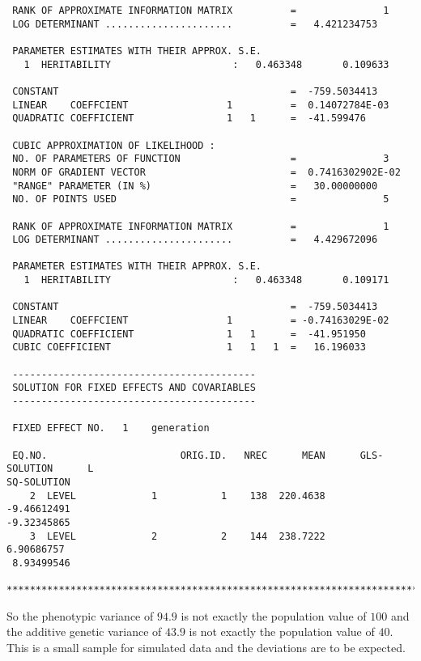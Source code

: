 \documentclass[titlepage]{article}  %
\begin{document}
\begin{verbatim}
 RANK OF APPROXIMATE INFORMATION MATRIX          =               1
 LOG DETERMINANT ......................          =   4.421234753    
  
 PARAMETER ESTIMATES WITH THEIR APPROX. S.E.
   1  HERITABILITY                     :   0.463348       0.109633    
  
 CONSTANT                                        =  -759.5034413    
 LINEAR    COEFFCIENT                 1          =  0.14072784E-03
 QUADRATIC COEFFICIENT                1   1      =  -41.599476    
  
 CUBIC APPROXIMATION OF LIKELIHOOD :
 NO. OF PARAMETERS OF FUNCTION                   =               3
 NORM OF GRADIENT VECTOR                         =  0.7416302902E-02
 "RANGE" PARAMETER (IN %)                        =   30.00000000    
 NO. OF POINTS USED                              =               5
  
 RANK OF APPROXIMATE INFORMATION MATRIX          =               1
 LOG DETERMINANT ......................          =   4.429672096    
  
 PARAMETER ESTIMATES WITH THEIR APPROX. S.E.
   1  HERITABILITY                     :   0.463348       0.109171    
  
 CONSTANT                                        =  -759.5034413    
 LINEAR    COEFFCIENT                 1          = -0.74163029E-02
 QUADRATIC COEFFICIENT                1   1      =  -41.951950    
 CUBIC COEFFICIENT                    1   1   1  =   16.196033    
  
 ------------------------------------------
 SOLUTION FOR FIXED EFFECTS AND COVARIABLES
 ------------------------------------------

 FIXED EFFECT NO.   1    generation  

 EQ.NO.                       ORIG.ID.   NREC      MEAN      GLS-SOLUTION      L
SQ-SOLUTION
    2  LEVEL             1           1    138  220.4638       -9.46612491       
-9.32345865
    3  LEVEL             2           2    144  238.7222        6.90686757       
 8.93499546

********************************************************************************
\end{verbatim}
 
So the phenotypic variance of $94.9$ is not exactly the population value of $100$ and the additive genetic variance of $43.9$ is not exactly the population value of $40$. This is a small sample for simulated data and the deviations are to be expected.
\end{document}

